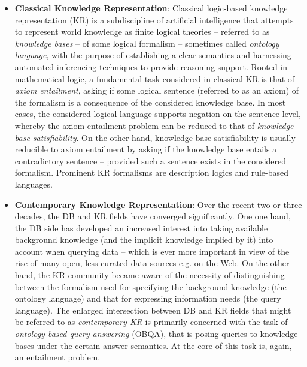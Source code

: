 \documentclass[10pt,a4paper]{amsart}
\theoremstyle{definition}
\numberwithin{equation}{section}
\theoremstyle{plain}
\theoremstyle{definition}
\theoremstyle{myexample}
\theoremstyle{plain}
\theoremstyle{definition}
\begin{document}
\begin{itemize}
Another way in which entailment arises in the area of databases is in static analysis of queries and views. The popular problem of query containment asks if every answer for $Q_1$ is an answer for $Q_2$ over every database.    
\item \textbf{Classical Knowledge Representation}: Classical logic-based knowledge representation (KR) is a subdiscipline of artificial intelligence that attempts to represent world knowledge as finite logical theories  -- referred to as \emph{knowledge bases} -- of some logical formalism -- sometimes called \emph{ontology language}, with the purpose of establishing a clear semantics and harnessing automated inferencing techniques to provide reasoning support. Rooted in mathematical logic, a fundamental task considered in classical KR is that of \emph{axiom entailment}, asking if some logical sentence (referred to as an axiom) of the formalism is a consequence of the considered knowledge base. In most cases, the considered logical language supports negation on the sentence level, whereby the axiom entailment problem can be reduced to that of \emph{knowledge base satisfiability}. On the other hand, knowledge base satisfiability is usually reducible to axiom entailment by asking if the knowledge base entails a contradictory sentence -- provided such a sentence exists in the considered formalism. Prominent KR formalisms are description logics and rule-based languages.     
\item \textbf{Contemporary Knowledge Representation}: Over the recent two or three decades, the DB and KR fields have converged significantly. One one hand, the DB side has developed an increased interest into taking available background knowledge (and the implicit knowledge implied by it) into account when querying data -- which is ever more important in view of the rise of many open, less curated data sources e.g. on the Web. On the other hand, the KR community became aware of the necessity of distinguishing between the formalism used for specifying the background knowledge (the ontology language) and that for expressing information needs (the query language). The enlarged intersection between DB and KR fields that might be referred to as \emph{contemporary KR} is primarily concerned with the task of \emph{ontology-based query answering} (OBQA), that is posing queries to knowledge bases under the certain answer semantics. At the core of this task is, again, an entailment problem. 
\end{itemize}


\medskip
\end{document}

